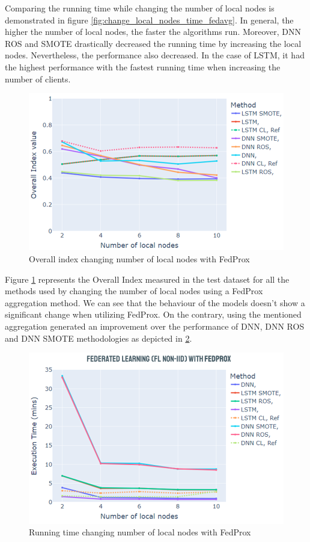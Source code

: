 Comparing the running time while changing the number of local nodes is demonstrated in figure \ref{fig:change_local_nodes_time_fedavg}. In general, the higher the number of local nodes, the faster the algorithms run. Moreover, DNN ROS and SMOTE drastically decreased the running time by increasing the local nodes. Nevertheless, the performance also decreased. In the case of LSTM, it had the highest performance with the fastest running time when increasing the number of clients.

\begin{figure}[H]
\centering
\includegraphics[scale=0.6]{img/change_local_nodes_metrics_fedavg.png}
\caption{Overall index changing number of local nodes with FedProx}
\label{fig:change_local_nodes_metrics_fedprox}
\end{figure}

Figure \ref{fig:change_local_nodes_metrics_fedprox} represents the Overall Index measured in the test dataset for all the methods used by changing the number of local nodes using a FedProx aggregation method. We can see that the behaviour of the models doesn't show a significant change when utilizing FedProx. On the contrary, using the mentioned aggregation generated an improvement over the performance of  DNN, DNN ROS and DNN SMOTE methodologies as depicted in \ref{fig:change_local_nodes_time_fedprox}.

\begin{figure}[H]
\centering
\includegraphics[scale=0.6]{img/change_local_nodes_time_fedprox.png}
\caption{Running time changing number of local nodes with FedProx}
\label{fig:change_local_nodes_time_fedprox}
\end{figure}


